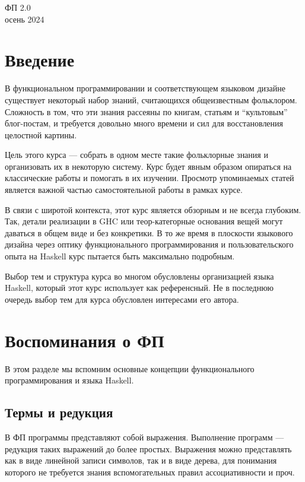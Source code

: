 \documentclass[12pt]{article}
\begin{document}
    \begin{center}
    {\LARGE ФП 2.0}
        \\
        осень 2024
    \end{center}

    \tableofcontents

    \newpage

    \section*{Введение}

    В функциональном программировании и соответствующем языковом дизайне существует некоторый набор знаний, считающихся общеизвестным фольклором.
    Сложность в том, что эти знания рассеяны по книгам, статьям и ``культовым'' блог-постам, и требуется довольно много времени и сил для восстановления целостной картины.

    Цель этого курса --- собрать в одном месте такие фольклорные знания и организовать их в некоторую систему.
    Курс будет явным образом опираться на классические работы и помогать в их изучении.
    Просмотр упоминаемых статей является важной частью самостоятельной работы в рамках курсе.

    В связи с широтой контекста, этот курс является обзорным и не всегда глубоким.
    Так, детали реализации в GHC или теор-категорные основания вещей могут даваться в общем виде и без конкретики.
    В то же время в плоскости языкового дизайна через оптику функционального программирования и пользовательского опыта на Haskell курс пытается быть максимально подробным.

    Выбор тем и структура курса во многом обусловлены организацией языка Haskell, который этот курс использует как референсный.
    Не в последнюю очередь выбор тем для курса обусловлен интересами его автора.


    \section{Воспоминания о ФП}

    В этом разделе мы вспомним основные концепции функционального программирования и языка Haskell.

    \subsection{Термы и редукция} \label{subsec:terms-reduction}

    В ФП программы представляют собой выражения.
    Выполнение программ --- редукция таких выражений до более простых.
    Выражения можно представлять как в виде линейной записи символов, так и в виде дерева, для понимания которого не требуется знания вспомогательных правил ассоциативности и проч.
\end{document}
